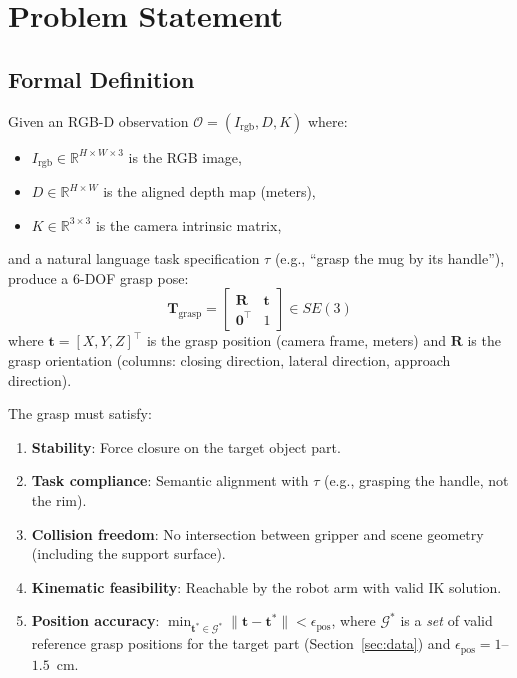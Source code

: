 \documentclass[11pt,a4paper]{article}
\begin{document}
\section{Problem Statement}

\subsection{Formal Definition}

Given an RGB-D observation $\mathcal{O} = (I_{\text{rgb}}, D, K)$ where:
\begin{itemize}[nosep]
    \item $I_{\text{rgb}} \in \mathbb{R}^{H \times W \times 3}$ is the RGB image,
    \item $D \in \mathbb{R}^{H \times W}$ is the aligned depth map (meters),
    \item $K \in \mathbb{R}^{3 \times 3}$ is the camera intrinsic matrix,
\end{itemize}
and a natural language task specification $\tau$ (e.g., ``grasp the mug by its handle''), produce a 6-DOF grasp pose:
\begin{equation}
    \mathbf{T}_{\text{grasp}} = \begin{bmatrix} \mathbf{R} & \mathbf{t} \\ \mathbf{0}^\top & 1 \end{bmatrix} \in SE(3)
\end{equation}
where $\mathbf{t} = [X, Y, Z]^\top$ is the grasp position (camera frame, meters) and $\mathbf{R}$ is the grasp orientation (columns: closing direction, lateral direction, approach direction).

The grasp must satisfy:
\begin{enumerate}[nosep]
    \item \textbf{Stability}: Force closure on the target object part.
    \item \textbf{Task compliance}: Semantic alignment with $\tau$ (e.g., grasping the handle, not the rim).
    \item \textbf{Collision freedom}: No intersection between gripper and scene geometry (including the support surface).
    \item \textbf{Kinematic feasibility}: Reachable by the robot arm with valid IK solution.
    \item \textbf{Position accuracy}: $\min_{\mathbf{t}^* \in \mathcal{G}^*} \|\mathbf{t} - \mathbf{t}^*\| < \epsilon_{\text{pos}}$, where $\mathcal{G}^*$ is a \emph{set} of valid reference grasp positions for the target part (Section~\ref{sec:data}) and $\epsilon_{\text{pos}} = 1$--$1.5$~cm.
\end{enumerate}
\end{document}
